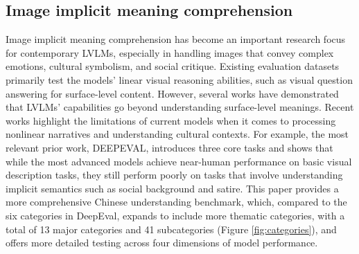 \subsection{Image implicit meaning comprehension}
Image implicit meaning comprehension has become an important research focus for contemporary LVLMs, especially in handling images that convey complex emotions, cultural symbolism, and social critique. Existing evaluation datasets primarily test the models' linear visual reasoning abilities, such as visual question answering for surface-level content\cite{Hudson_2019_CVPR}. However, several works \cite{cai2019multi, machajdik2010affective} have demonstrated that LVLMs’ capabilities go beyond understanding surface-level meanings. Recent works\cite{yang2024largemultimodalmodelsuncover, liu2024iibenchimageimplicationunderstanding} highlight the limitations of current models when it comes to processing nonlinear narratives and understanding cultural contexts. For example, the most relevant prior work, DEEPEVAL\cite{yang2024largemultimodalmodelsuncover}, introduces three core tasks and shows that while the most advanced models achieve near-human performance on basic visual description tasks, they still perform poorly on tasks that involve understanding implicit semantics such as social background and satire. This paper provides a more comprehensive Chinese understanding benchmark, which, compared to the six categories in DeepEval, expands to include more thematic categories, with a total of 13 major categories and 41 subcategories (Figure \ref{fig:categories}), and offers more detailed testing across four dimensions of model performance.

